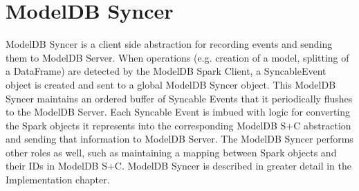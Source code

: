 \section{ModelDB Syncer}
ModelDB Syncer is a client side abstraction for recording events and sending them
to ModelDB Server. When operations (e.g. creation of a model, splitting of a DataFrame)
are detected by the ModelDB Spark Client, a SyncableEvent object is created and sent to
a global ModelDB Syncer object. This ModelDB Syncer maintains an ordered buffer of Syncable Events
that it periodically flushes to the ModelDB Server. Each Syncable Event is imbued with logic for converting
the Spark objects it represents into the corresponding ModelDB S+C abstraction and sending that information to
ModelDB Server. The ModelDB Syncer performs other roles as well, such as maintaining a mapping between Spark
objects and their IDs in ModelDB S+C. ModelDB Syncer is described in greater detail in the Implementation chapter.
